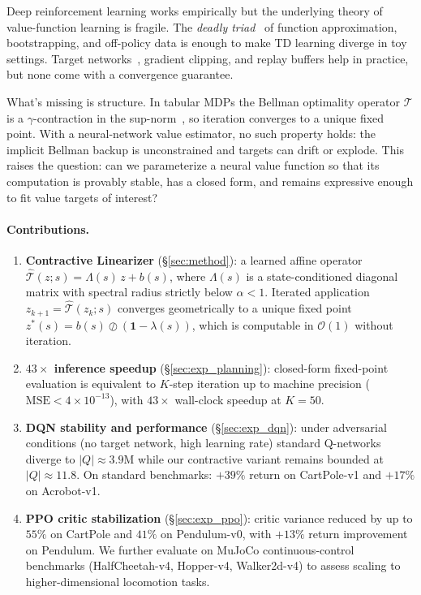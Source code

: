 \documentclass{article}
\newcommand{\cT}{\hat{\mathcal{T}}}          %
\newcommand{\zstar}{z^*}                     %
\newcommand{\spb}{\alpha}                    %
\newcommand{\eigs}{\lambda}                  %
\begin{document}
Deep reinforcement learning works empirically
\citep{mnih2015human,schulman2017proximal,haarnoja2018soft} but the
underlying theory of value-function learning is fragile.
The \emph{deadly triad}~\citep{sutton2018reinforcement} of function
approximation, bootstrapping, and off-policy data is enough to make TD
learning diverge in toy settings.
Target networks~\citep{mnih2015human}, gradient clipping, and replay buffers
help in practice, but none come with a convergence guarantee.

What's missing is structure. In tabular MDPs the Bellman optimality operator
$\mathcal{T}$ is a $\gamma$-contraction in the sup-norm~\citep{bellman1957dynamic},
so iteration converges to a unique fixed point. With a neural-network value
estimator, no such property holds: the implicit Bellman backup is unconstrained
and targets can drift or explode. This raises the question: can we parameterize a neural value
function so that its computation is provably stable, has a closed form, and
remains expressive enough to fit value targets of interest?

\paragraph{Contributions.}
\begin{enumerate}
  \item \textbf{Contractive Linearizer} (\S\ref{sec:method}): a learned affine
  operator $\cT(z; s) = \Lambda(s)\,z + b(s)$, where $\Lambda(s)$ is a state-conditioned diagonal matrix with spectral radius strictly below $\spb < 1$.
  Iterated application $z_{k+1} = \cT(z_k; s)$ converges geometrically to a
  unique fixed point $\zstar(s) = b(s) \oslash (\mathbf{1} - \eigs(s))$, which
  is computable in $\mathcal{O}(1)$ without iteration.

  \item \textbf{$43\times$ inference speedup} (\S\ref{sec:exp_planning}):
  closed-form fixed-point evaluation is equivalent to $K$-step iteration up to
  machine precision ($\text{MSE} < 4 \times 10^{-13}$), with $43\times$ wall-clock
  speedup at $K=50$.

  \item \textbf{DQN stability and performance} (\S\ref{sec:exp_dqn}): under
  adversarial conditions (no target network, high learning rate) standard
  Q-networks diverge to $|Q| \approx 3.9\mathrm{M}$ while our contractive
  variant remains bounded at $|Q| \approx 11.8$.
  On standard benchmarks: $+39\%$ return on CartPole-v1 and $+17\%$ on Acrobot-v1.

  \item \textbf{PPO critic stabilization} (\S\ref{sec:exp_ppo}): critic variance
  reduced by up to $55\%$ on CartPole and $41\%$ on Pendulum-v0, with $+13\%$ return
  improvement on Pendulum.
  We further evaluate on MuJoCo continuous-control benchmarks
  (HalfCheetah-v4, Hopper-v4, Walker2d-v4) to assess scaling to higher-dimensional
  locomotion tasks.
\end{enumerate}
\end{document}
